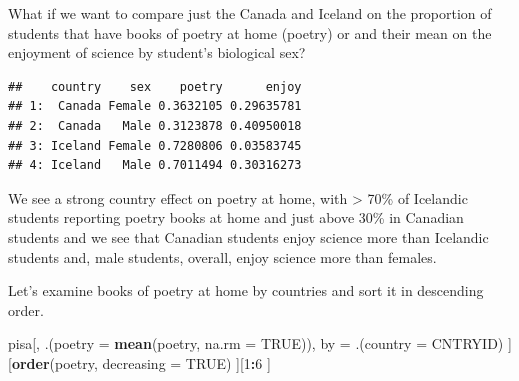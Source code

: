 \documentclass[]{book}
\newenvironment{Shaded}{\begin{snugshade}}{\end{snugshade}}
\newcommand{\DataTypeTok}[1]{\textcolor[rgb]{0.13,0.29,0.53}{#1}}
\newcommand{\DecValTok}[1]{\textcolor[rgb]{0.00,0.00,0.81}{#1}}
\newcommand{\KeywordTok}[1]{\textcolor[rgb]{0.13,0.29,0.53}{\textbf{#1}}}
\newcommand{\NormalTok}[1]{#1}
\newcommand{\OperatorTok}[1]{\textcolor[rgb]{0.81,0.36,0.00}{\textbf{#1}}}
\newcommand{\OtherTok}[1]{\textcolor[rgb]{0.56,0.35,0.01}{#1}}
\newcommand{\StringTok}[1]{\textcolor[rgb]{0.31,0.60,0.02}{#1}}
\begin{document}
What if we want to compare just the Canada and Iceland on the proportion of students that have books of poetry at home (poetry) or and their mean on the enjoyment of science by student's biological sex?

\begin{Shaded}
\end{Shaded}

\begin{verbatim}
##    country    sex    poetry      enjoy
## 1:  Canada Female 0.3632105 0.29635781
## 2:  Canada   Male 0.3123878 0.40950018
## 3: Iceland Female 0.7280806 0.03583745
## 4: Iceland   Male 0.7011494 0.30316273
\end{verbatim}

We see a strong country effect on poetry at home, with \textgreater{} 70\% of Icelandic students reporting poetry books at home and just above 30\% in Canadian students and we see that Canadian students enjoy science more than Icelandic students and, male students, overall, enjoy science more than females.

Let's examine books of poetry at home by countries and sort it in descending order.

\begin{Shaded}
\begin{Highlighting}[]
\NormalTok{pisa[,}
\NormalTok{     .(}\DataTypeTok{poetry =} \KeywordTok{mean}\NormalTok{(poetry, }\DataTypeTok{na.rm =} \OtherTok{TRUE}\NormalTok{)),}
\NormalTok{     by =}\StringTok{ }\NormalTok{.(}\DataTypeTok{country =}\NormalTok{ CNTRYID)}
\NormalTok{     ][}\KeywordTok{order}\NormalTok{(poetry, }\DataTypeTok{decreasing =} \OtherTok{TRUE}\NormalTok{)}
\NormalTok{       ][}\DecValTok{1}\OperatorTok{:}\DecValTok{6}
\NormalTok{         ]}
\end{Highlighting}
\end{Shaded}
\end{document}
